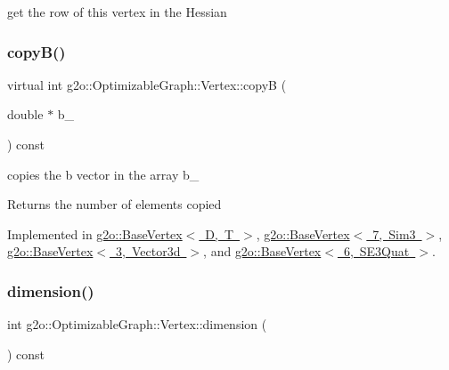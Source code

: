 get the row of this vertex in the Hessian 

\mbox{\label{classg2o_1_1_optimizable_graph_1_1_vertex_af544f0050ea6e05950fd6e53931bdf61}} 
\subsubsection{\texorpdfstring{copy\+B()}{copyB()}}
{\footnotesize\ttfamily virtual int g2o\+::\+Optimizable\+Graph\+::\+Vertex\+::copyB (\begin{DoxyParamCaption}\item[{double $\ast$}]{b\+\_\+ }\end{DoxyParamCaption}) const\hspace{0.3cm}{\ttfamily [pure virtual]}}

copies the b vector in the array b\+\_\+ \begin{DoxyReturn}{Returns}
the number of elements copied 
\end{DoxyReturn}


Implemented in \mbox{\hyperlink{classg2o_1_1_base_vertex_a3629d3b15da425476e15867fb03b781b}{g2o\+::\+Base\+Vertex$<$ D, T $>$}}, \mbox{\hyperlink{classg2o_1_1_base_vertex_a3629d3b15da425476e15867fb03b781b}{g2o\+::\+Base\+Vertex$<$ 7, Sim3 $>$}}, \mbox{\hyperlink{classg2o_1_1_base_vertex_a3629d3b15da425476e15867fb03b781b}{g2o\+::\+Base\+Vertex$<$ 3, Vector3d $>$}}, and \mbox{\hyperlink{classg2o_1_1_base_vertex_a3629d3b15da425476e15867fb03b781b}{g2o\+::\+Base\+Vertex$<$ 6, S\+E3\+Quat $>$}}.

\mbox{\label{classg2o_1_1_optimizable_graph_1_1_vertex_a86feed80301950b100142575b48e4fca}} 
\subsubsection{\texorpdfstring{dimension()}{dimension()}}
{\footnotesize\ttfamily int g2o\+::\+Optimizable\+Graph\+::\+Vertex\+::dimension (\begin{DoxyParamCaption}{ }\end{DoxyParamCaption}) const\hspace{0.3cm}{\ttfamily [inline]}}




